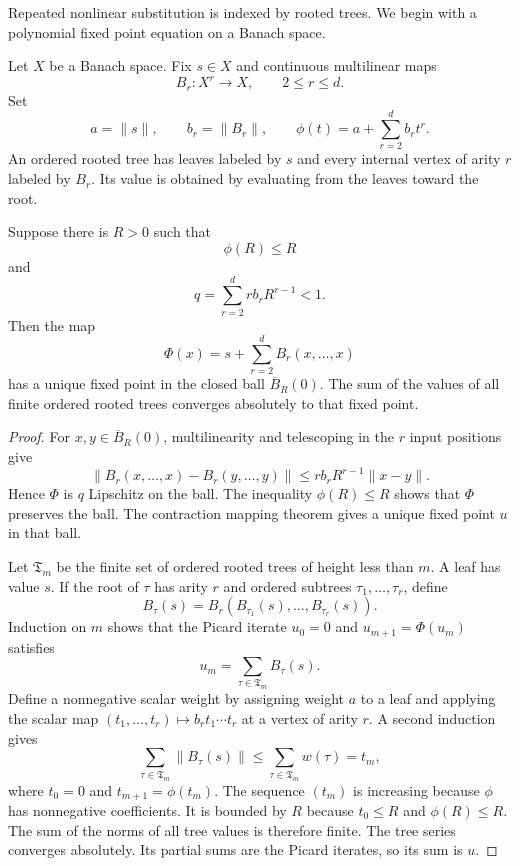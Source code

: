 Repeated nonlinear substitution is indexed by rooted trees.  We begin with a polynomial fixed point equation on a Banach space.

Let $X$ be a Banach space.  Fix $s\in X$ and continuous multilinear maps
\[
B_r:X^r\longrightarrow X,
\qquad
2\le r\le d.
\]
Set
\[
a=\|s\|,
\qquad
b_r=\|B_r\|,
\qquad
\phi(t)=a+\sum_{r=2}^{d}b_rt^r.
\]
An ordered rooted tree has leaves labeled by $s$ and every internal vertex of arity $r$ labeled by $B_r$.  Its value is obtained by evaluating from the leaves toward the root.

\begin{theorem}\label{thm:polynomial_tree_expansion}
Suppose there is $R>0$ such that
\[
\phi(R)\le R
\]
and
\[
q=
\sum_{r=2}^{d}r b_rR^{r-1}<1.
\]
Then the map
\[
\Phi(x)=s+\sum_{r=2}^{d}B_r(x,\ldots,x)
\]
has a unique fixed point in the closed ball $\overline B_R(0)$.  The sum of the values of all finite ordered rooted trees converges absolutely to that fixed point.
\end{theorem}

\begin{proof}
For $x,y\in\overline B_R(0)$, multilinearity and telescoping in the $r$ input positions give
\[
\|B_r(x,\ldots,x)-B_r(y,\ldots,y)\|
\le
r b_rR^{r-1}\|x-y\|.
\]
Hence $\Phi$ is $q$ Lipschitz on the ball.  The inequality $\phi(R)\le R$ shows that $\Phi$ preserves the ball.  The contraction mapping theorem gives a unique fixed point $u$ in that ball.

Let $\mathfrak T_m$ be the finite set of ordered rooted trees of height less than $m$.  A leaf has value $s$.  If the root of $\tau$ has arity $r$ and ordered subtrees $\tau_1,\ldots,\tau_r$, define
\[
B_\tau(s)=B_r(B_{\tau_1}(s),\ldots,B_{\tau_r}(s)).
\]
Induction on $m$ shows that the Picard iterate $u_0=0$ and $u_{m+1}=\Phi(u_m)$ satisfies
\[
u_m=\sum_{\tau\in\mathfrak T_m}B_\tau(s).
\]
Define a nonnegative scalar weight by assigning weight $a$ to a leaf and applying the scalar map $(t_1,\ldots,t_r)\mapsto b_rt_1\cdots t_r$ at a vertex of arity $r$.  A second induction gives
\[
\sum_{\tau\in\mathfrak T_m}\|B_\tau(s)\|
\le
\sum_{\tau\in\mathfrak T_m}w(\tau)
=t_m,
\]
where $t_0=0$ and $t_{m+1}=\phi(t_m)$.  The sequence $(t_m)$ is increasing because $\phi$ has nonnegative coefficients.  It is bounded by $R$ because $t_0\le R$ and $\phi(R)\le R$.  The sum of the norms of all tree values is therefore finite.  The tree series converges absolutely.  Its partial sums are the Picard iterates, so its sum is $u$.
\end{proof}

